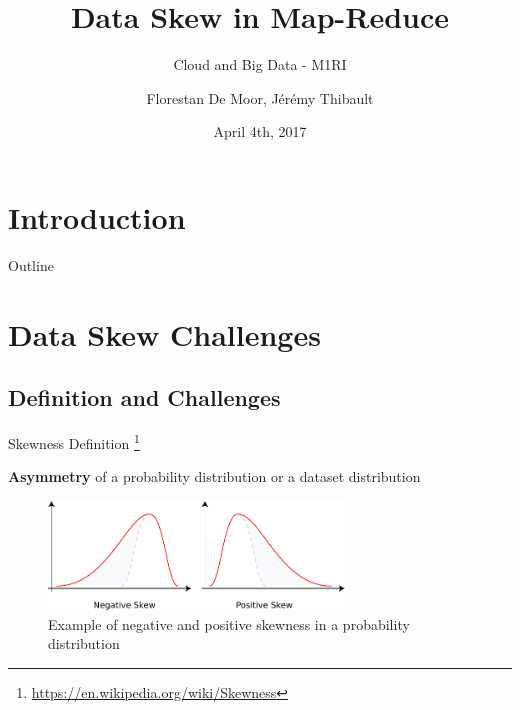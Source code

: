 \documentclass[11pt]{beamer}
\title{Data Skew in Map-Reduce}
\subtitle{Cloud and Big Data - M1RI}
\date{April 4th, 2017}
\author{Florestan De Moor, Jérémy Thibault}
\begin{document}

\begin{frame}
    \maketitle
\end{frame}


\section{Introduction}


\begin{frame}{Outline}
    \tableofcontents
\end{frame}


\section{Data Skew Challenges}


\subsection{Definition and Challenges}


\begin{frame}{Skewness Definition \footnote{\url{https://en.wikipedia.org/wiki/Skewness}}}

\textbf{Asymmetry} of a probability distribution or a dataset distribution

\vfill

\begin{exampleblock}{}
\begin{figure}
    \centering
    \includegraphics[width=0.7\textwidth]{skewness}
    \caption{Example of negative and positive skewness in a probability distribution}
    \label{img:skewness_def}
\end{figure}
\end{exampleblock}

\end{frame}
\end{document}
